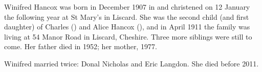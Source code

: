 
Winifred Hancox was born in December 1907 in \cite{BMD1907} and christened on 12 January the following year at St Mary's in Liscard.\cite{ParishReg} She was the second child (and first daughter) of Charles () and Alice Hancox (), and in April 1911 the family was living at 54 Manor Road in Liscard, Cheshire.\cite{1911Census} Three more siblings were still to come. Her father died in 1952; her mother, 1977.

Winifred married twice: Donal Nicholas and Eric Langdon. She died before 2011.
